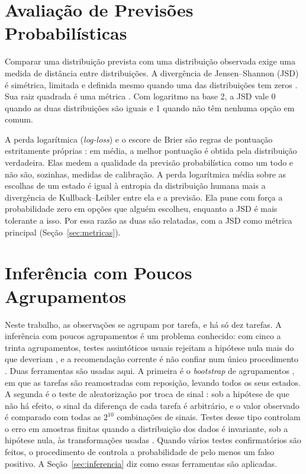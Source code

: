 \documentclass[12pt,oneside,a4paper,chapter=TITLE,english,brazil]{abntex2}
\begin{document}
\section{Avaliação de Previsões Probabilísticas}
\label{sec:avaliacaoprob}

Comparar uma distribuição prevista com uma distribuição observada exige uma medida de distância entre distribuições. A divergência de Jensen--Shannon (JSD) é simétrica, limitada e definida mesmo quando uma das distribuições tem zeros \cite{lin1991jsd}. Sua raiz quadrada é uma métrica \cite{endres2003metric}. Com logaritmo na base 2, a JSD vale 0 quando as duas distribuições são iguais e 1 quando não têm nenhuma opção em comum.

A perda logarítmica (\textit{log-loss}) e o escore de Brier são regras de pontuação estritamente próprias \cite{gneiting2007proper,brier1950}: em média, a melhor pontuação é obtida pela distribuição verdadeira. Elas medem a qualidade da previsão probabilística como um todo e não são, sozinhas, medidas de calibração. A perda logarítmica média sobre as escolhas de um estado é igual à entropia da distribuição humana mais a divergência de Kullback--Leibler entre ela e a previsão. Ela pune com força a probabilidade zero em opções que alguém escolheu, enquanto a JSD é mais tolerante a isso. Por essa razão as duas são relatadas, com a JSD como métrica principal (Seção~\ref{sec:metricas}).

\section{Inferência com Poucos Agrupamentos}
\label{sec:poucos}

Neste trabalho, as observações se agrupam por tarefa, e há só dez tarefas. A inferência com poucos agrupamentos é um problema conhecido: com cinco a trinta agrupamentos, testes assintóticos usuais rejeitam a hipótese nula mais do que deveriam \cite{cameron2008bootstrap}, e a recomendação corrente é não confiar num único procedimento \cite{mackinnon2023guide,esarey2019clustered}. Duas ferramentas são usadas aqui. A primeira é o \textit{bootstrap} de agrupamentos \cite{efron1993bootstrap}, em que as tarefas são reamostradas com reposição, levando todos os seus estados. A segunda é o teste de aleatorização por troca de sinal \cite{good2005permutation}: sob a hipótese de que não há efeito, o sinal da diferença de cada tarefa é arbitrário, e o valor observado é comparado com todas as $2^{10}$ combinações de sinais. Testes desse tipo controlam o erro em amostras finitas quando a distribuição dos dados é invariante, sob a hipótese nula, às transformações usadas \cite{canay2017randomization}. Quando vários testes confirmatórios são feitos, o procedimento de  controla a probabilidade de pelo menos um falso positivo. A Seção~\ref{sec:inferencia} diz como essas ferramentas são aplicadas.
\end{document}

